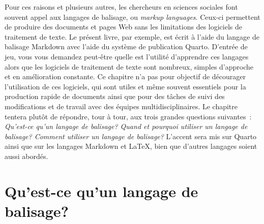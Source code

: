 \documentclass[
  letterpaper,
]{scrbook}
\begin{document}
Pour ces raisons et plusieurs autres, les chercheurs en sciences
sociales font souvent appel aux langages de balisage, ou \emph{markup
languages}. Ceux-ci permettent de produire des documents et pages Web
sans les limitations des logiciels de traitement de texte. Le présent
livre, par exemple, est écrit à l'aide du langage de balisage Markdown
avec l'aide du système de publication Quarto. D'entrée de jeu, vous vous
demandez peut-être quelle est l'utilité d'apprendre ces langages alors
que les logiciels de traitement de texte sont nombreux, simples
d'approche et en amélioration constante. Ce chapitre n'a pas pour
objectif de décourager l'utilisation de ces logiciels, qui sont utiles
et même souvent essentiels pour la production rapide de documents ainsi
que pour des tâches de suivi des modifications et de travail avec des
équipes multidisciplinaires. Le chapitre tentera plutôt de répondre,
tour à tour, aux trois grandes questions suivantes~: \emph{Qu'est-ce
qu'un langage de balisage? Quand et pourquoi utiliser un langage de
balisage? Comment utiliser un langage de balisage?} L'accent sera mis
sur Quarto ainsi que sur les langages Markdown et \LaTeX, bien que
d'autres langages soient aussi abordés.

\hypertarget{quest-ce-quun-langage-de-balisage}{%
\section{Qu'est-ce qu'un langage de
balisage?}\label{quest-ce-quun-langage-de-balisage}}
\end{document}
